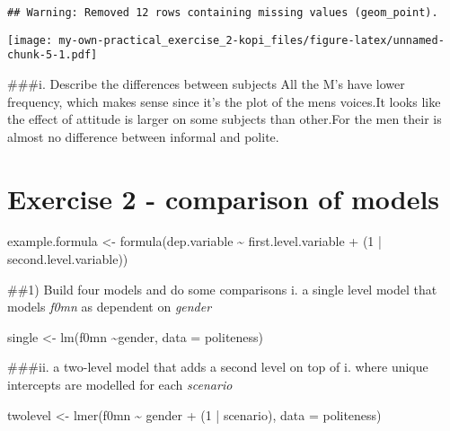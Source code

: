 \documentclass[
]{article}
\newenvironment{Shaded}{\begin{snugshade}}{\end{snugshade}}
\newcommand{\AttributeTok}[1]{\textcolor[rgb]{0.77,0.63,0.00}{#1}}
\newcommand{\DecValTok}[1]{\textcolor[rgb]{0.00,0.00,0.81}{#1}}
\newcommand{\FunctionTok}[1]{\textcolor[rgb]{0.00,0.00,0.00}{#1}}
\newcommand{\NormalTok}[1]{#1}
\newcommand{\OtherTok}[1]{\textcolor[rgb]{0.56,0.35,0.01}{#1}}
\newcommand{\SpecialCharTok}[1]{\textcolor[rgb]{0.00,0.00,0.00}{#1}}
\begin{document}
\begin{verbatim}
## Warning: Removed 12 rows containing missing values (geom_point).
\end{verbatim}

\texttt{[image: my-own-practical\_exercise\_2-kopi\_files/figure-latex/unnamed-chunk-5-1.pdf]}

\#\#\#i. Describe the differences between subjects All the M's have
lower frequency, which makes sense since it's the plot of the mens
voices.It looks like the effect of attitude is larger on some subjects
than other.For the men their is almost no difference between informal
and polite.

\hypertarget{exercise-2---comparison-of-models}{%
\section{Exercise 2 - comparison of
models}\label{exercise-2---comparison-of-models}}

\begin{Shaded}
\begin{Highlighting}[]
\NormalTok{example.formula }\OtherTok{\textless{}{-}} \FunctionTok{formula}\NormalTok{(dep.variable }\SpecialCharTok{\textasciitilde{}}\NormalTok{ first.level.variable }\SpecialCharTok{+}\NormalTok{ (}\DecValTok{1} \SpecialCharTok{|}\NormalTok{ second.level.variable))}
\end{Highlighting}
\end{Shaded}

\#\#1) Build four models and do some comparisons i. a single level model
that models \emph{f0mn} as dependent on \emph{gender}

\begin{Shaded}
\begin{Highlighting}[]
\NormalTok{single }\OtherTok{\textless{}{-}} \FunctionTok{lm}\NormalTok{(f0mn }\SpecialCharTok{\textasciitilde{}}\NormalTok{gender, }\AttributeTok{data =}\NormalTok{ politeness)}
\end{Highlighting}
\end{Shaded}

\#\#\#ii. a two-level model that adds a second level on top of i. where
unique intercepts are modelled for each \emph{scenario}

\begin{Shaded}
\begin{Highlighting}[]
\NormalTok{twolevel }\OtherTok{\textless{}{-}} \FunctionTok{lmer}\NormalTok{(f0mn }\SpecialCharTok{\textasciitilde{}}\NormalTok{ gender }\SpecialCharTok{+}\NormalTok{ (}\DecValTok{1} \SpecialCharTok{|}\NormalTok{ scenario), }\AttributeTok{data =}\NormalTok{ politeness)}
\end{Highlighting}
\end{Shaded}
\end{document}
